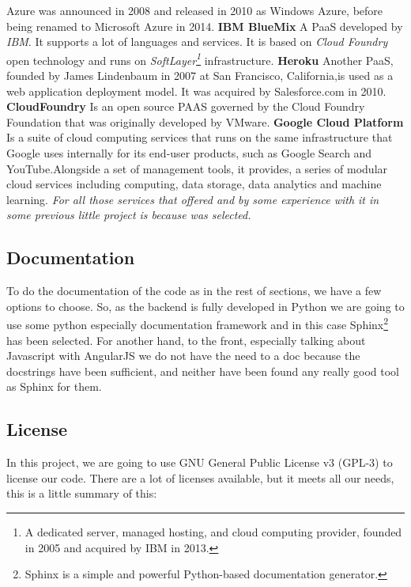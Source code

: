 Azure was announced in  2008 and released in 2010 as Windows Azure,
before being renamed to Microsoft Azure in 2014.
\pagebreak
\intro
\textbf{IBM BlueMix}
\intro
A PaaS developed by \textit{IBM}. It supports a lot of languages and services. It is
based on \textit{Cloud Foundry} open technology and runs on
\textit{SoftLayer\footnote{A dedicated server, managed hosting, and cloud
computing provider, founded in 2005 and acquired by IBM in 2013.}} infrastructure.
\intro
\textbf{Heroku}
\intro
Another PaaS, founded by James Lindenbaum in 2007 at
San Francisco, California,is used as a web application deployment model.
It was acquired by Salesforce.com in 2010.
\intro
\textbf{CloudFoundry}
\intro Is an open source PAAS governed by the Cloud Foundry Foundation that
was originally developed by VMware.
\intro
\textbf{Google Cloud Platform}
\intro Is a suite of cloud computing services
that runs on the same infrastructure that Google uses internally for its end-user
products, such as Google Search and YouTube.Alongside a set of management tools,
it provides, a series of modular cloud services including computing, data storage,
data analytics and machine learning.
\intro
\textit{For all those services that offered and by some experience with it in
some previous little project is because was selected.}

\subsection{Documentation}

To do the documentation of the code as in the rest of sections, we have a few options
to choose. So, as the backend is fully developed in Python we are going to use some python
especially documentation framework and in this case Sphinx\footnote{Sphinx is a
simple and powerful Python-based documentation generator.} has been selected.
\intro
For another hand, to the front, especially talking about Javascript with AngularJS
we do not have the need to a doc because the docstrings have been sufficient,
and neither have been found any really good tool as Sphinx for them. \pagebreak

\subsection{License}

In this project, we are going to use GNU General Public License v3 (GPL-3)
to license our code.
There are a lot of licenses available, but it meets all our needs,
this is a little summary of this:

